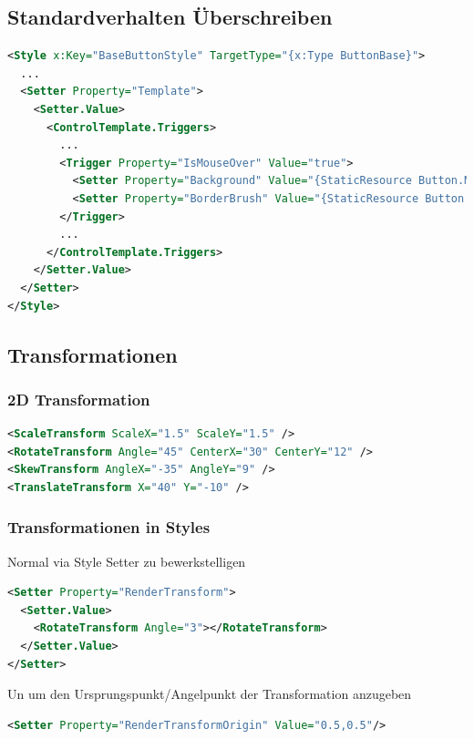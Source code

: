 \subsection{Standardverhalten Überschreiben}
\begin{lstlisting}[language=xml]
<Style x:Key="BaseButtonStyle" TargetType="{x:Type ButtonBase}"> 
  ... 
  <Setter Property="Template"> 
    <Setter.Value> 
      <ControlTemplate.Triggers> 
        ... 
        <Trigger Property="IsMouseOver" Value="true"> 
          <Setter Property="Background" Value="{StaticResource Button.MouseOver.Background}" TargetName="border" /> 
          <Setter Property="BorderBrush" Value="{StaticResource Button.MouseOver.Border}" TargetName="border" /> 
        </Trigger> 
        ... 
      </ControlTemplate.Triggers> 
    </Setter.Value> 
  </Setter> 
</Style>
\end{lstlisting}

\subsection{Transformationen}
\subsubsection{2D Transformation}
\begin{lstlisting}[language=xml]
<ScaleTransform ScaleX="1.5" ScaleY="1.5" />
<RotateTransform Angle="45" CenterX="30" CenterY="12" /> 
<SkewTransform AngleX="-35" AngleY="9" />
<TranslateTransform X="40" Y="-10" /> 
\end{lstlisting}
\subsubsection{Transformationen in Styles}
Normal via Style Setter zu bewerkstelligen
\begin{lstlisting}[language=xml]
<Setter Property="RenderTransform"> 
  <Setter.Value> 
    <RotateTransform Angle="3"></RotateTransform> 
  </Setter.Value> 
</Setter> 
\end{lstlisting}
Un um den Ursprungspunkt/Angelpunkt der Transformation anzugeben
\begin{lstlisting}[language=xml]
<Setter Property="RenderTransformOrigin" Value="0.5,0.5"/> 
\end{lstlisting}
